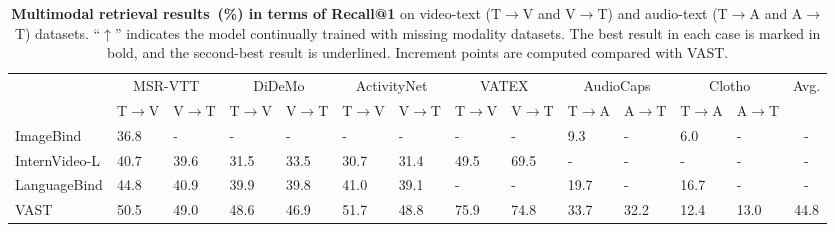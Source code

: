 
\begin{table}[t]
\centering
\caption{\textbf{Multimodal retrieval results~(\%) in terms of Recall@1} on video-text (T$\rightarrow$V and V$\rightarrow$T) and audio-text (T$\rightarrow$A and A$\rightarrow$T) datasets. ``$\uparrow$'' indicates the model continually trained with missing modality datasets. The best result in each case is marked in bold, and the second-best result is underlined. Increment points are computed compared with VAST. }
\vspace{-2mm}
\label{tab:overall_performance}
\begin{adjustbox}{width=\textwidth,center}
\begin{tabular}{@{}l|ll|ll|ll|ll|ll|ll|c@{}}
\toprule
 & \multicolumn{2}{c|}{MSR-VTT} & \multicolumn{2}{c|}{DiDeMo} & \multicolumn{2}{c|}{ActivityNet}  & \multicolumn{2}{c|}{VATEX}   & \multicolumn{2}{c|}{AudioCaps}  & \multicolumn{2}{c|}{Clotho} & Avg. \\  & T$\rightarrow$V    & V$\rightarrow$T   & T$\rightarrow$V     & V$\rightarrow$T  & T$\rightarrow$V    & V$\rightarrow$T  & T$\rightarrow$V    & V$\rightarrow$T  & T$\rightarrow$A    & A$\rightarrow$T   & T$\rightarrow$A    & A$\rightarrow$T    \\ \midrule
ImageBind  & 36.8    &  -  & -        & -     & -    & -  & -&-&9.3 &- & 6.0 & - & -\\
InternVideo-L & 40.7 &    39.6   & 31.5     & 33.5     & 30.7      & 31.4 & 49.5 & 69.5 &- &- & - & -& -\\
LanguageBind & 44.8     & 40.9   & 39.9    & 39.8  & 41.0      &  39.1 & - & - &19.7 &- & 16.7 & - & -\\ \midrule
 VAST       & 50.5                                                 & 49.0                                                 & 48.6                                                 & 46.9                                                 & 51.7                                                 & 48.8                                                 & 75.9                                                 & 74.8                                                 & 33.7                                                 & 32.2                                                 & 12.4                                                 & 13.0   & 44.8                                              \\

\end{tabular}
\end{adjustbox}
\end{table}
